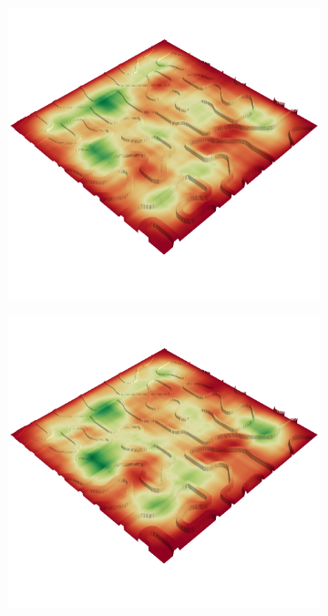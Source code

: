 \documentclass[../document.tex]{subfiles}
\begin{document}
\begin{figure} [htbp]
  \centering
  \begin{subfigure}[b]{0.45\textwidth}
    \includegraphics[width=\linewidth]{../img/4/traversability/bars/-270.png} 
  \end{subfigure}
  \begin{subfigure}[b]{0.45\textwidth}
      \includegraphics[width=\linewidth]{../img/4/traversability/bars/-90.png}

\end{subfigure}
\end{figure}
\end{document}
